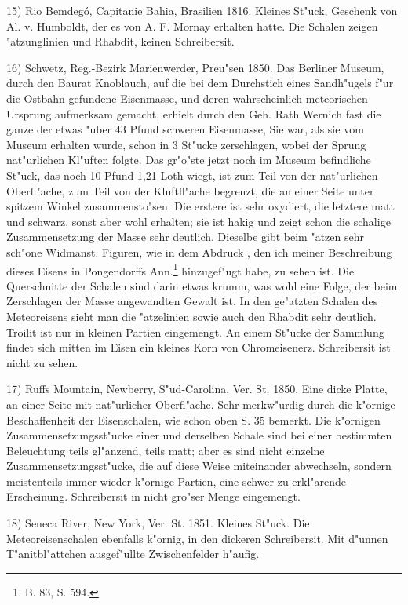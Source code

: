 \documentclass[a4paper, 11pt, oneside]{article}
\begin{document}
15) Rio Bemdegó, Capitanie Bahia, Brasilien 1816. Kleines St"uck, Geschenk von Al. v. Humboldt, der es von A. F. Mornay erhalten hatte. Die Schalen zeigen "atzunglinien und Rhabdit, keinen Schreibersit.

16) Schwetz, Reg.-Bezirk Marienwerder, Preu"sen 1850. Das Berliner Museum, durch den Baurat Knoblauch, auf die bei dem Durchstich eines Sandh"ugels f"ur die Ostbahn gefundene Eisenmasse, und deren wahrscheinlich meteorischen Ursprung aufmerksam gemacht, erhielt durch den Geh. Rath Wernich fast die ganze der etwas "uber 43 Pfund schweren Eisenmasse, Sie war, als sie vom Museum erhalten wurde, schon in 3 St"ucke zerschlagen, wobei der Sprung nat"urlichen Kl"uften folgte. Das gr"o"ste jetzt noch im Museum befindliche St"uck, das noch 10 Pfund 1,21 Loth wiegt, ist zum Teil von der nat"urlichen Oberfl"ache, zum Teil von der Kluftfl"ache begrenzt, die an einer Seite unter spitzem Winkel zusammensto"sen. Die erstere ist sehr oxydiert, die letztere matt und schwarz, sonst aber wohl erhalten; sie ist hakig und zeigt schon die schalige Zusammensetzung der Masse sehr deutlich. Dieselbe gibt beim "atzen sehr sch"one Widmanst. Figuren, wie in dem Abdruck , den ich meiner Beschreibung dieses Eisens in Pongendorffs Ann.\footnote{B. 83, S. 594.} hinzugef"ugt habe, zu sehen ist. Die Querschnitte der Schalen sind darin etwas krumm, was wohl eine Folge, der beim Zerschlagen der Masse angewandten Gewalt ist. In den ge"atzten Schalen des Meteoreisens sieht man die "atzelinien sowie auch den Rhabdit sehr deutlich. Troilit ist nur in kleinen Partien eingemengt. An einem St"ucke der Sammlung findet sich mitten im Eisen ein kleines Korn von Chromeisenerz. Schreibersit ist nicht zu sehen.

17) Ruffs Mountain, Newberry, S"ud-Carolina, Ver. St. 1850. Eine dicke Platte, an einer Seite mit nat"urlicher Oberfl"ache. Sehr merkw"urdig durch die k"ornige Beschaffenheit der Eisenschalen, wie schon oben S. 35 bemerkt. Die k"ornigen Zusammensetzungsst"ucke einer und derselben Schale sind bei einer bestimmten Beleuchtung teils gl"anzend, teils matt; aber es sind nicht einzelne Zusammensetzungsst"ucke, die auf diese Weise miteinander abwechseln, sondern meistenteils immer wieder k"ornige Partien, eine schwer zu erkl"arende Erscheinung. Schreibersit in nicht gro"ser Menge eingemengt.

18) Seneca River, New York, Ver. St. 1851. Kleines St"uck. Die Meteoreisenschalen ebenfalls k"ornig, in den dickeren Schreibersit. Mit d"unnen T"anitbl"attchen ausgef"ullte Zwischenfelder h"aufig.
\end{document}
